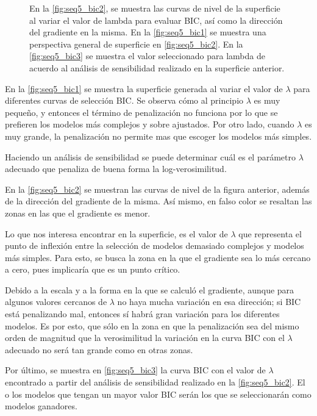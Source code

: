 \begin{figure}[t!]
{\begin{subfigure}[b]{0.55\textwidth}
    \caption{}
    \label{fig:seq5_bic3}
  \end{subfigure}
  }
  \caption[Secuencia 5: Pruebas BIC]{En la \autoref{fig:seq5_bic2}, se muestra las curvas de nivel de la superficie al variar el valor de lambda para evaluar BIC, así como la dirección del gradiente en la misma. En la \autoref{fig:seq5_bic1} se muestra una perspectiva general de superficie en \autoref{fig:seq5_bic2}. En la \autoref{fig:seq5_bic3} se muestra el valor seleccionado para lambda de acuerdo al análisis de sensibilidad realizado en la superficie anterior.}
  \label{fig:seq1_bic}
\end{figure}

En la \autoref{fig:seq5_bic1} se muestra la superficie generada al variar el valor de $\lambda$ para diferentes curvas de selección BIC. Se observa cómo al principio $\lambda$ es muy pequeño, y entonces el término de penalización no funciona por lo que se prefieren los modelos más complejos y sobre ajustados. Por otro lado, cuando $\lambda$ es muy grande, la penalización no permite mas que escoger los modelos más simples.

Haciendo un análisis de sensibilidad se puede determinar cuál es el parámetro $\lambda$ adecuado que penaliza de buena forma la log-verosimilitud.

En la \autoref{fig:seq5_bic2} se muestran las curvas de nivel de la figura anterior, además de la dirección del gradiente de la misma. Así mismo, en falso color se resaltan las zonas en las que el gradiente es menor. 

Lo que nos interesa encontrar en la superficie, es el valor de $\lambda$ que representa el punto de inflexión entre la selección de modelos demasiado complejos y modelos más simples. Para esto, se busca la zona en la que el gradiente sea lo más cercano a cero, pues implicaría que es un punto crítico.

Debido a la escala y a la forma en la que se calculó el gradiente, aunque para algunos valores cercanos de $\lambda$ no haya mucha variación en esa dirección; si BIC está penalizando mal, entonces sí habrá gran variación para los diferentes modelos. Es por esto, que sólo en la zona en que la penalización sea del mismo orden de magnitud que la verosimilitud la variación en la curva BIC con el $\lambda$ adecuado no será tan grande como en otras zonas.

Por último, se muestra en \autoref{fig:seq5_bic3} la curva BIC con el valor de $\lambda$ encontrado a partir del análisis de sensibilidad realizado en la \autoref{fig:seq5_bic2}. El o los modelos que tengan un mayor valor BIC serán los que se seleccionarán como modelos ganadores.

